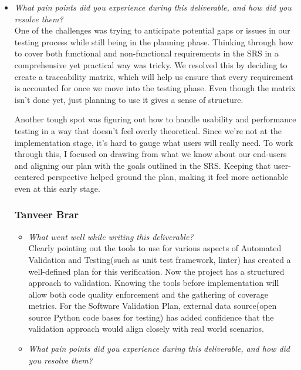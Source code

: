 \documentclass[12pt, titlepage]{article}
\begin{document}
\begin{appendices}
\begin{itemize}
  \item \textit{What pain points did you experience during this deliverable, and how did you resolve them?}\\ 
  
  One of the challenges was trying to anticipate potential gaps or issues 
  in our testing process while still being in the planning phase. Thinking 
  through how to cover both functional and non-functional requirements in
  the SRS in a comprehensive yet practical way was tricky. We resolved this
  by deciding to create a traceability matrix, which will help us ensure that 
  every requirement is accounted for once we move into the testing phase. Even 
  though the matrix isn’t done yet, just planning to use it gives a sense 
  of structure. 

  Another tough spot was figuring out how to handle usability and performance 
  testing in a way that doesn’t feel overly theoretical. Since we’re not at the 
  implementation stage, it’s hard to gauge what users will really need. To work 
  through this, I focused on drawing from what we know about our end-users and 
  aligning our plan with the goals outlined in the SRS. Keeping that user-centered 
  perspective helped ground the plan, making it feel more actionable even at this 
  early stage.

\subsubsection*{Tanveer Brar}
\begin{itemize}
    \item \textit{What went well while writing this deliverable?} \\

    Clearly pointing out the tools to use for various aspects of Automated Validation and Testing(such as unit test framework, linter) has created a well-defined plan for this verification. Now the project has a structured approach to validation. Knowing the tools before implementation will allow both code quality enforcement and the gathering of coverage metrics. For the Software Validation Plan, external data source(open source Python code bases for testing) has added confidence that the validation approach would align closely with real world scenarios.

    \item \textit{What pain points did you experience during this deliverable, and how did you resolve them?}\\


\end{itemize}
\end{itemize}
\end{appendices}
\end{document}
